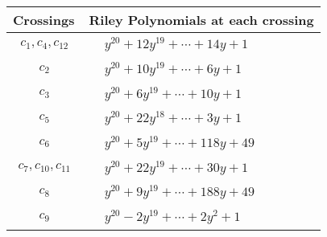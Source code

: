 \documentclass[1p]{elsarticle_modified}
\theoremstyle{definition}
\begin{document}
\begin{tabular}{m{50pt}|m{274pt}}
Crossings & \hspace{64pt}Riley Polynomials at each crossing \\
\hline $$\begin{aligned}c_{1},c_{4},c_{12}\end{aligned}$$&$\begin{aligned}
&y^{20}+12 y^{19}+\cdots+14 y+1
\end{aligned}$\\
\hline $$\begin{aligned}c_{2}\end{aligned}$$&$\begin{aligned}
&y^{20}+10 y^{19}+\cdots+6 y+1
\end{aligned}$\\
\hline $$\begin{aligned}c_{3}\end{aligned}$$&$\begin{aligned}
&y^{20}+6 y^{19}+\cdots+10 y+1
\end{aligned}$\\
\hline $$\begin{aligned}c_{5}\end{aligned}$$&$\begin{aligned}
&y^{20}+22 y^{18}+\cdots+3 y+1
\end{aligned}$\\
\hline $$\begin{aligned}c_{6}\end{aligned}$$&$\begin{aligned}
&y^{20}+5 y^{19}+\cdots+118 y+49
\end{aligned}$\\
\hline $$\begin{aligned}c_{7},c_{10},c_{11}\end{aligned}$$&$\begin{aligned}
&y^{20}+22 y^{19}+\cdots+30 y+1
\end{aligned}$\\
\hline $$\begin{aligned}c_{8}\end{aligned}$$&$\begin{aligned}
&y^{20}+9 y^{19}+\cdots+188 y+49
\end{aligned}$\\
\hline $$\begin{aligned}c_{9}\end{aligned}$$&$\begin{aligned}
&y^{20}-2 y^{19}+\cdots+2 y^2+1
\end{aligned}$\\
\hline
\end{tabular}\\~\\
\end{document}
